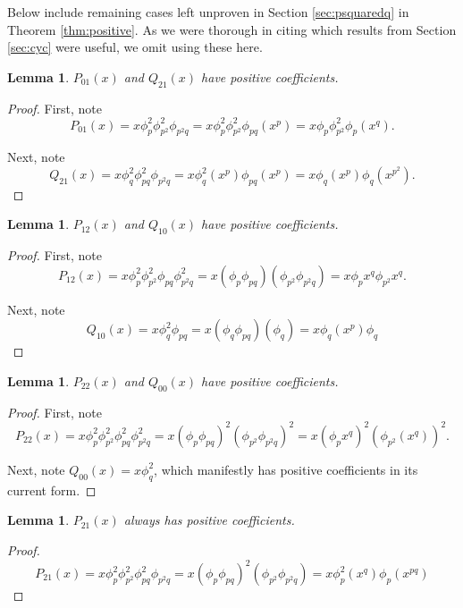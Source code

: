 \documentclass[11pt]{amsart}
\numberwithin{equation}{section}
\theoremstyle{plain}
\newtheorem{lemma}[equation]{Lemma}
\theoremstyle{definition}
\begin{document}
Below include remaining cases left unproven in Section \ref{sec:psquaredq} in Theorem \ref{thm:positive}. As we were thorough in citing which results from Section \ref{sec:cyc} were useful, we omit using these here.

\begin{lemma}\label{lemma:P_01}
$P_{01}(x)$ and $Q_{21}(x)$ have positive coefficients.
\end{lemma}

\begin{proof}
First, note 
$$P_{01}(x)=x\phi_p^2\phi_{p^2}^2\phi_{p^2q}=x\phi_p^2\phi_{p^2}^2\phi_{pq}(x^p)=x\phi_p\phi_{p^2}^2\phi_p(x^q).$$

Next, note
$$Q_{21}(x)=x\phi_q^2\phi_{pq}^2\phi_{p^2q}=x\phi_q^2(x^p)\phi_{pq}(x^p)=x\phi_q(x^p)\phi_q(x^{p^2}).$$
\end{proof}

\begin{lemma}\label{lemma:P_12}
$P_{12}(x)$ and $Q_{10}(x)$ have positive coefficients.
\end{lemma}

\begin{proof} 
First, note
$$P_{12}(x)=x\phi_p^2\phi_{p^2}^2\phi_{pq}\phi_{p^2q}^2=x(\phi_{p}\phi_{pq})(\phi_{p^2}\phi_{p^2q})=x\phi_p{x^q}\phi_{p^2}{x^q}.$$


Next, note
$$Q_{10}(x)=x\phi_q^2\phi_{pq}=x(\phi_{q}\phi_{pq})(\phi_{q})=x\phi_{q}(x^p)\phi_{q}$$
\end{proof}



\begin{lemma}\label{lemma:P_22}
$P_{22}(x)$ and $Q_{00}(x)$ have positive coefficients.
\end{lemma}

\begin{proof} 
First, note
$$P_{22}(x)=x\phi_p^2\phi_{p^2}^2\phi_{pq}^2\phi_{p^2q}^2=x(\phi_{p}\phi_{pq})^2(\phi_{p^2}\phi_{p^2q})^2=x(\phi_p{x^q})^2(\phi_{p^2}(x^q))^2.$$

Next, note $Q_{00}(x)=x\phi_q^2$, which manifestly has positive coefficients in its current form.
\end{proof}


\begin{lemma}\label{lemma:P_21}
$P_{21}(x)$ always has positive coefficients.
\end{lemma}
\begin{proof}
$$P_{21}(x)=x\phi_p^2\phi_{p^2}^2\phi_{pq}^2\phi_{p^2q}=x(\phi_p\phi_{pq})^2(\phi_{p^2}\phi_{p^2q})=x\phi_p^2(x^q)\phi_{p}(x^{pq})$$
\end{proof}
\end{document}
